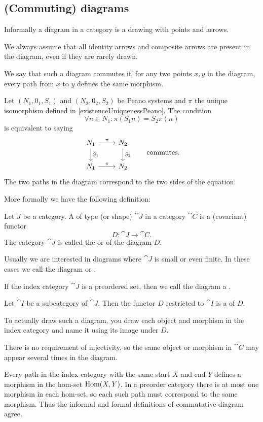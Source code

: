 \subsection{(Commuting) diagrams}
Informally a diagram in a category is a drawing with points and arrows.

We always assume that all identity arrows and composite arrows are present in the diagram, even if they are rarely drawn.

We say that such a diagram commutes if, for any two points $x,y$ in the diagram, every path from $x$ to $y$ defines the same morphism.

\begin{example}
Let $(N_1, 0_1, S_1)$ and $(N_2, 0_2, S_2)$ be Peano systems and $\pi$ the unique isomorphism defined in \ref{existenceUniquenessPeano}. The condition
\[ \forall n\in N_1: \pi(S_1n) = S_2\pi(n) \]
is equivalent to saying
\[ \begin{tikzcd}
N_1 \ar[r, "\pi"] \ar[d, "S_1"] & N_2 \ar[d, "S_2"] \\
N_1 \ar[r, "\pi"] & N_2
\end{tikzcd} \qquad \text{commutes.} \]
The two paths in the diagram correspond to the two sides of the equation.
\end{example}

More formally we have the following definition:
\begin{definition}
Let $J$ be a category.
A  of type (or shape) $\cat{J}$ in a category $\cat{C}$ is a (covariant) functor
\[ D: \cat{J} \to \cat{C}. \]
The category $\cat{J}$ is called the  or  of the diagram $D$.

Usually we are interested in diagrams where $\cat{J}$ is small or even finite. In these cases we call the diagram  or .

If the index category $\cat{J}$ is a preordered set, then we call the diagram a .

Let $\cat{I}$ be a subcategory of $\cat{J}$. Then the functor $D$ restricted to $\cat{I}$ is a  of $D$.
\end{definition}
To actually draw such a diagram, you draw each object and morphism in the index category and name it using its image under $D$.

There is no requirement of injectivity, so the same object or morphism in $\cat{C}$ may appear several times in the diagram.

Every path in the index category with the same start $X$ and end $Y$ defines a morphism in the hom-set $\operatorname{Hom}(X,Y)$. In a preorder category there is at most one morphism in each hom-set, so each such path must correspond to the same morphism. Thus the informal and formal definitions of commutative diagram agree.

